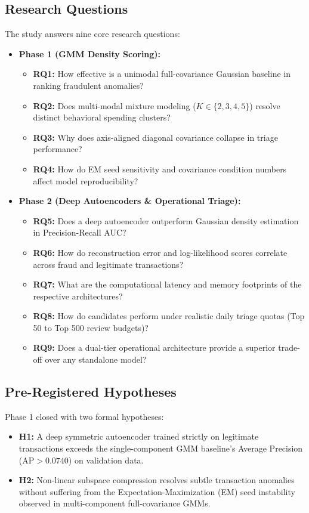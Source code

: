 \documentclass[conference]{IEEEtran}
\begin{document}
\subsection{Research Questions}
The study answers nine core research questions:
\begin{itemize}
    \item \textbf{Phase 1 (GMM Density Scoring):}
    \begin{itemize}
        \item \textbf{RQ1:} How effective is a unimodal full-covariance Gaussian baseline in ranking fraudulent anomalies?
        \item \textbf{RQ2:} Does multi-modal mixture modeling ($K \in \{2, 3, 4, 5\}$) resolve distinct behavioral spending clusters?
        \item \textbf{RQ3:} Why does axis-aligned diagonal covariance collapse in triage performance?
        \item \textbf{RQ4:} How do EM seed sensitivity and covariance condition numbers affect model reproducibility?
    \end{itemize}
    \item \textbf{Phase 2 (Deep Autoencoders \& Operational Triage):}
    \begin{itemize}
        \item \textbf{RQ5:} Does a deep autoencoder outperform Gaussian density estimation in Precision-Recall AUC?
        \item \textbf{RQ6:} How do reconstruction error and log-likelihood scores correlate across fraud and legitimate transactions?
        \item \textbf{RQ7:} What are the computational latency and memory footprints of the respective architectures?
        \item \textbf{RQ8:} How do candidates perform under realistic daily triage quotas (Top 50 to Top 500 review budgets)?
        \item \textbf{RQ9:} Does a dual-tier operational architecture provide a superior trade-off over any standalone model?
    \end{itemize}
\end{itemize}

\subsection{Pre-Registered Hypotheses}
Phase 1 closed with two formal hypotheses:
\begin{itemize}
    \item \textbf{H1:} A deep symmetric autoencoder trained strictly on legitimate transactions exceeds the single-component GMM baseline's Average Precision ($\text{AP} > 0.0740$) on validation data.
    \item \textbf{H2:} Non-linear subspace compression resolves subtle transaction anomalies without suffering from the Expectation-Maximization (EM) seed instability observed in multi-component full-covariance GMMs.
\end{itemize}
\end{document}
